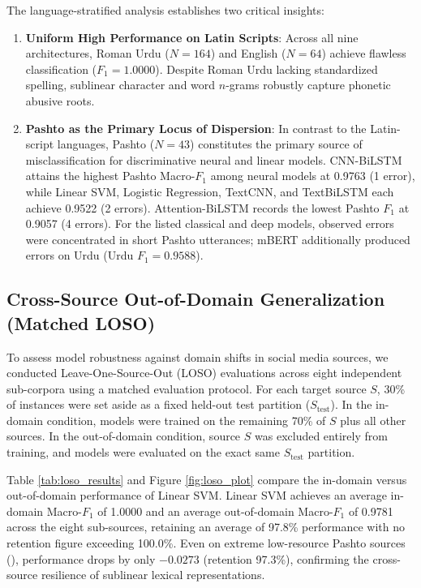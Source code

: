 \documentclass[11pt,a4paper]{article}
\begin{document}
The language-stratified analysis establishes two critical insights:
\begin{enumerate}
    \item \textbf{Uniform High Performance on Latin Scripts}: Across all nine architectures, Roman Urdu ($N = 164$) and English ($N = 64$) achieve flawless classification ($F_1 = 1.0000$). Despite Roman Urdu lacking standardized spelling, sublinear character and word $n$-grams robustly capture phonetic abusive roots.
    \item \textbf{Pashto as the Primary Locus of Dispersion}: In contrast to the Latin-script languages, Pashto ($N = 43$) constitutes the primary source of misclassification for discriminative neural and linear models. CNN-BiLSTM attains the highest Pashto Macro-$F_1$ among neural models at 0.9763 (1 error), while Linear SVM, Logistic Regression, TextCNN, and TextBiLSTM each achieve 0.9522 (2 errors). Attention-BiLSTM records the lowest Pashto $F_1$ at 0.9057 (4 errors). For the listed classical and deep models, observed errors were concentrated in short Pashto utterances; mBERT additionally produced errors on Urdu (Urdu $F_1 = 0.9588$).
\end{enumerate}

\subsection{Cross-Source Out-of-Domain Generalization (Matched LOSO)}
To assess model robustness against domain shifts in social media sources, we conducted Leave-One-Source-Out (LOSO) evaluations across eight independent sub-corpora using a matched evaluation protocol. For each target source $S$, 30\% of instances were set aside as a fixed held-out test partition ($S_{\text{test}}$). In the in-domain condition, models were trained on the remaining 70\% of $S$ plus all other sources. In the out-of-domain condition, source $S$ was excluded entirely from training, and models were evaluated on the exact same $S_{\text{test}}$ partition.

Table \ref{tab:loso_results} and Figure \ref{fig:loso_plot} compare the in-domain versus out-of-domain performance of Linear SVM. Linear SVM achieves an average in-domain Macro-$F_1$ of 1.0000 and an average out-of-domain Macro-$F_1$ of 0.9781 across the eight sub-sources, retaining an average of 97.8\% performance with no retention figure exceeding 100.0\%. Even on extreme low-resource Pashto sources (), performance drops by only $-0.0273$ (retention 97.3\%), confirming the cross-source resilience of sublinear lexical representations.
\end{document}

